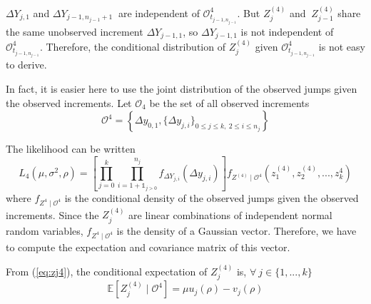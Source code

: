 \noindent $\Delta Y_{j,1}$ and $\Delta Y_{j-1,n_{j-1}+1}\ $ are independent of $\mathcal{O}_{t_{j-1,n_{j-1}}}^4$. But $Z_j^{(4)}$ and $\ Z_{j-1}^{(4)}$ share the same unobserved increment $\Delta Y_{j-1,1}$, so $\Delta Y_{j-1,1}$ is not independent of $\mathcal{O}_{t_{j-1,n_{j-1}}}^4$. Therefore, the conditional distribution of $Z_j^{(4)}$ given $\mathcal{O}_{t_{j-1,n_{j-1}}}^4$ is not easy to derive.

\noindent In fact, it is easier here to use the joint distribution of the observed jumps given the observed increments. Let $\mathcal{O}_4$ be the set of all observed increments
$$\mathcal{O}^4=\left\{\Delta y_{0,1},\{\Delta y_{j,i}\}_{ 0 \leq j \leq k,\ 2 \leq i \leq n_j }\right\}$$

\noindent The likelihood can be written
\begin{equation}
L_4\left(\mu,\sigma^2,\rho \right)
=\left[\prod \limits_{j=0}^{k}\prod\limits_{i=1+\mathds{1}_{j>0}}^{n_j}f_{\Delta Y_{j,i}}\left(\Delta y_{j,i}\right) \right]  f_{Z^{(4)} \mid \mathcal{O}^4}\left(z_{1}^{(4)},z_{2}^{(4)},...,z_k^4\right) 
\label{eq:like_scheme4}
\end{equation}
\noindent where $f_{Z^4 \mid \mathcal{O}^4}$ is the conditional density of the observed jumps given the observed increments. Since the $Z_j^{(4)}$ are linear combinations of independent normal random variables, $f_{Z^4 \mid \mathcal{O}^4}$ is the density of a Gaussian vector. Therefore, we have to compute the expectation and covariance matrix of this vector.


\noindent From (\ref{eq:zj4}), the conditional expectation of $Z_j^{(4)}$ is, $\forall\ j \in \{1,...,k\} $
\begin{equation}
\mathbb{E}\left[Z_j^{(4)} \mid \mathcal{O}^4\right] = \mu u_j(\rho) - v_j(\rho)
\label{eq:espzj4}
\end{equation}

